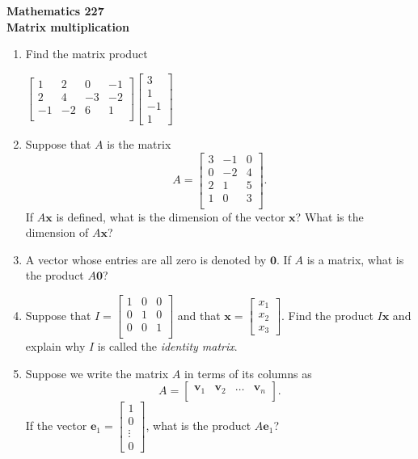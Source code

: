 \documentclass[12pt]{article}
\newcommand{\ds}{\displaystyle}
\newcommand{\vs}[1]{\vspace{#1in}}
\newcommand{\evec}{{\mathbf e}}
\newcommand{\vvec}{{\mathbf v}}
\newcommand{\xvec}{{\mathbf x}}
\newcommand{\zerovec}{{\mathbf 0}}
\newcommand{\threevec}[3]{\left[\begin{array}{r}#1 \\ #2 \\ #3
  \end{array}\right]}
\newcommand{\fourvec}[4]{\left[\begin{array}{r}#1 \\ #2 \\ #3 \\ #4
    \end{array}\right]}
\begin{document}
\noindent
{\bf Mathematics 227} \\ 
{\bf Matrix multiplication}

\bigskip
\begin{enumerate}
\item Find the matrix product

  $
  \ds
  \left[
    \begin{array}{cccc}
      1 & 2 & 0 & -1 \\
      2 & 4 & -3 & -2 \\
      -1 & -2 & 6 & 1 \\
    \end{array}
  \right]
  \fourvec31{-1}1
  $

  \vs{2}
  

\item Suppose that $A$ is the matrix
  $$
  A =
  \left[
    \begin{array}{ccc}
      3 & -1 & 0 \\
      0 & -2 & 4 \\
      2 & 1 & 5 \\
      1 & 0 & 3 \\
    \end{array}
  \right].
  $$
  If $A\xvec$ is defined, what is the dimension of the vector $\xvec$?
  What is the dimension of $A\xvec$?

  \vs{1}
\item A vector whose entries are all zero is denoted by
  $\zerovec$.  If $A$ is a matrix, what is the
  product $A\zerovec$?

  \vs{1}
  \newpage
\item Suppose that
  $I =
  \left[
    \begin{array}{rrr}
      1 & 0 & 0 \\
      0 & 1 & 0 \\
      0 & 0 & 1 \\
    \end{array}
  \right]
  $
  and that $\xvec=\threevec{x_1}{x_2}{x_3}$.  Find the product
  $I\xvec$
  and explain why $I$ is called the
  {\em identity matrix}.

  \vs{1.5}

\item Suppose we write the matrix $A$ in terms of its columns
  as 
  $$
  A =
  \left[
    \begin{array}{rrrr}
      \vvec_1 & \vvec_2 & \ldots & \vvec_n \\
    \end{array}
  \right].
  $$
  If the vector
  $\evec_1 =
  \left[
    \begin{array}{r} 1 \\ 0 \\ \vdots \\ 0
    \end{array}
  \right]$, what is the product
  $A\evec_1$?


\end{enumerate}
\end{document}
